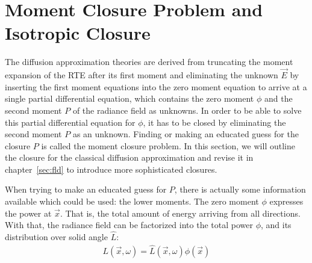 \section{Moment Closure Problem and Isotropic Closure}
\label{sec:moment_closure}

The diffusion approximation theories are derived from truncating the moment expansion of the RTE after its first moment and eliminating the unknown $\vec{E}$ by inserting the first moment equations into the zero moment equation to arrive at a single partial differential equation, which contains the zero moment $\phi$ and the second moment $P$ of the radiance field as unknowns. In order to be able to solve this partial differential equation for $\phi$, it has to be closed by eliminating the second moment $P$ as an unknown. Finding or making an educated guess for the closure $P$ is called the moment closure problem. In this section, we will outline the closure for the classical diffusion approximation and revise it in chapter~\ref{sec:fld} to introduce more sophisticated closures.

When trying to make an educated guess for $P$, there is actually some information available which could be used: the lower moments. The zero moment $\phi$ expresses the power at $\vec{x}$. That is, the total amount of energy arriving from all directions. With that, the radiance field can be factorized into the total power $\phi$, and its distribution over solid angle $\hat{L}$:
\begin{align*}
L(\vec{x}, \omega) = \hat{L}(\vec{x}, \omega)\phi(\vec{x})
\end{align*}

